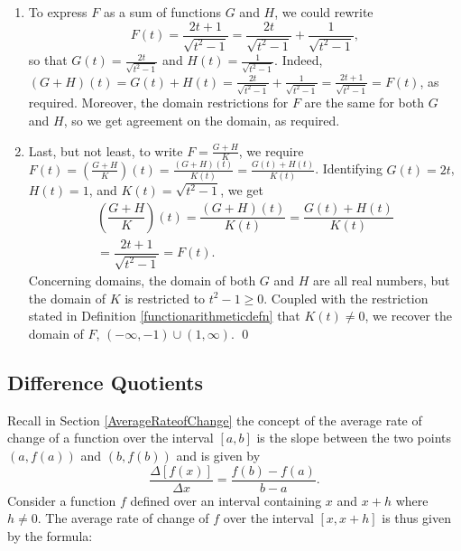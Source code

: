 \begin{ex}
\begin{enumerate}
\begin{enumerate}
\item  To express $F$ as a sum of functions $G$ and $H$, we could rewrite \[ F(t) =  \dfrac{2t+1}{\sqrt{t^2-1}} = \dfrac{2t}{\sqrt{t^2-1}} + \dfrac{1}{\sqrt{t^2-1}},\] so that $G(t) =  \frac{2t}{\sqrt{t^2-1}}$ and $H(t) =  \frac{1}{\sqrt{t^2-1}}$.  Indeed, $(G+H)(t) = G(t)+H(t) =  \frac{2t}{\sqrt{t^2-1}} +  \frac{1}{\sqrt{t^2-1}} = \frac{2t+1}{\sqrt{t^2-1}} = F(t)$, as required.  Moreover, the domain restrictions for $F$ are the same for both $G$ and $H$, so we get agreement on the domain, as required.

\item Last, but not least, to write $F = \frac{G+H}{K}$, we require $F(t) =\left(\frac{G+H}{K}\right)(t) = \frac{(G+H)(t)}{K(t)} = \frac{G(t)+H(t)}{K(t)}$.  Identifying $G(t) = 2t$, $H(t) = 1$, and $K(t) = \sqrt{t^2-1}$, we get \begin{multline*}
  \left(\dfrac{G+H}{K}\right)(t) = \dfrac{(G+H)(t)}{K(t)} = \dfrac{G(t) + H(t)}{K(t)} \\
  = \dfrac{2t+1}{\sqrt{t^2-1}} = F(t).
\end{multline*} Concerning domains, the domain of both $G$ and $H$ are all real numbers, but the domain of $K$ is restricted to $t^2-1 \geq 0$.  Coupled with the restriction stated in Definition \ref{functionarithmeticdefn} that $K(t) \neq 0$, we recover the domain of $F$, $(-\infty, -1) \cup (1, \infty)$. \qed

\end{enumerate}

\end{enumerate}

\end{ex}

\subsection{Difference Quotients}
\label{differencequotients}

Recall  in Section \ref{AverageRateofChange} the concept of the average rate of change of a function over the interval $[a,b]$  is the slope between the two points $(a, f(a))$ and $(b, f(b))$ and is given by \[ \dfrac{\Delta[f(x)]}{\Delta x} = \dfrac{f(b)-f(a)}{b-a}.\]
Consider a function $f$ defined over an interval containing $x$ and $x+h$ where $h \neq 0$. The average rate of change of $f$ over the interval $[x,x+h]$ is thus given by the formula:

